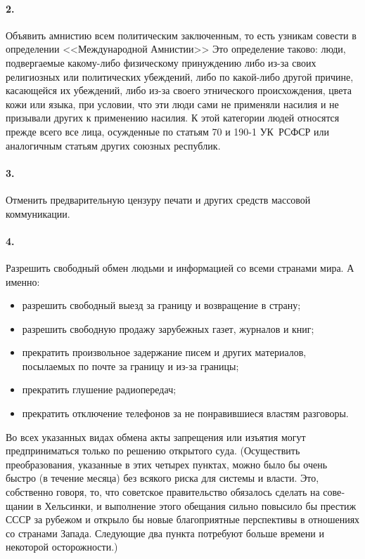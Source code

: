 \documentclass{book}
\begin{document}
\paragraph{2.} Объявить амнистию всем политическим заключенным, то есть узникам совести  в определении <<Международной Амнистии>> Это определение таково: люди, подвергаемые какому-либо физическому принуждению либо из-за своих религиоз­ных или политических убеждений, либо по какой-либо другой причине, касающейся их убеждений, либо из-за своего этниче­ского происхождения, цвета кожи или языка, при условии, что эти люди сами не применяли насилия и не призывали дру­гих к применению насилия. К этой категории людей относят­ся прежде всего все лица, осужденные по статьям 70 и 190-1 УК~РСФСР или аналогичным статьям других союзных респуб­лик.

\paragraph{3.} Отменить предварительную цензуру печати и других средств массовой коммуникации.

\paragraph{4.} Разрешить свободный обмен людьми и информацией со всеми странами мира. А именно:
\begin{itemize}
 \item разрешить свободный выезд за границу и возвращение в страну;
 \item разрешить свободную продажу зарубежных газет, журна­лов и книг;
 \item прекратить произвольное задержание писем и других ма­териалов, посылаемых по почте за границу и из-за границы;
 \item прекратить глушение радиопередач;
 \item прекратить отключение телефонов за не понравившиеся властям разговоры.
\end{itemize}

Во всех указанных видах обмена акты запрещения или изъя­тия могут предприниматься только по решению открытого су­да.
(Осуществить преобразования, указанные в этих четырех пунктах, можно было бы очень быстро (в течение месяца) без всякого риска для системы и власти. Это, собственно гово­ря, то, что советское правительство обязалось сделать на сове­щании в Хельсинки, и выполнение этого обещания сильно повы­сило бы престиж СССР за рубежом и открыло бы новые благо­приятные перспективы в отношениях со странами Запада. Сле­дующие два пункта потребуют больше времени и некоторой осторожности.)
\end{document}
